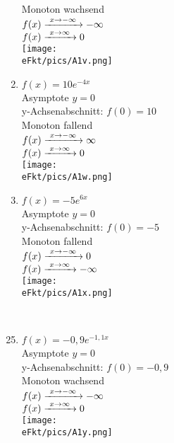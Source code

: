 \begin{Answer}[ref=eFktA1]
\begin{minipage}{\textwidth}
\begin{minipage}[t]{0.49\textwidth}
\begin{enumerate}[label=\alph*)]
				Monoton wachsend\\
				\(f(x)\xrightarrow{\hphantom{\ }x\to-\infty\hphantom{\ }}-\infty\)\\
				\(f(x)\xrightarrow{\hphantom{\ }x\to\infty\hphantom{\ }}0\)\\
				\texttt{[image: \\eFkt/pics/A1v.png]}
				\item \(f(x)=10e^{-4x}\)\\
				Asymptote \(y=0\)\\
				y-Achsenabschnitt: \(f(0)=10\)\\
				Monoton fallend\\
				\(f(x)\xrightarrow{\hphantom{\ }x\to-\infty\hphantom{\ }}\infty\)\\
				\(f(x)\xrightarrow{\hphantom{\ }x\to\infty\hphantom{\ }}0\)\\
				\texttt{[image: \\eFkt/pics/A1w.png]}
				\item \(f(x)=-5e^{6x}\)\\
				Asymptote \(y=0\)\\
				y-Achsenabschnitt: \(f(0)=-5\)\\
				Monoton fallend\\
				\(f(x)\xrightarrow{\hphantom{\ }x\to-\infty\hphantom{\ }}0\)\\
				\(f(x)\xrightarrow{\hphantom{\ }x\to\infty\hphantom{\ }}-\infty\)\\
				\texttt{[image: \\eFkt/pics/A1x.png]}
			\end{enumerate}
		\end{minipage}
	\end{minipage}\\
	\begin{minipage}{\textwidth}
		\begin{minipage}[t]{0.49\textwidth}
			\begin{enumerate}[label=\alph*)]
				\setcounter{enumi}{24}
				\item \(f(x)=-0,9e^{-1,1x}\)\\
				Asymptote \(y=0\)\\
				y-Achsenabschnitt: \(f(0)=-0,9\)\\
				Monoton wachsend\\
				\(f(x)\xrightarrow{\hphantom{\ }x\to-\infty\hphantom{\ }}-\infty\)\\
				\(f(x)\xrightarrow{\hphantom{\ }x\to\infty\hphantom{\ }}0\)\\
				\texttt{[image: \\eFkt/pics/A1y.png]}

\end{enumerate}
\end{minipage}
\end{minipage}
\end{Answer}

